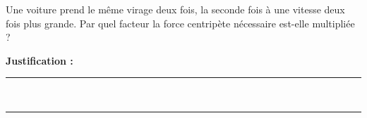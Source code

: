 Une voiture prend le même virage deux fois, la seconde fois à une vitesse deux fois plus grande. Par quel facteur la force centripète nécessaire est-elle multipliée ?

\choices

\noindent\textbf{Justification :} \hrulefill \\[2.5ex]
\rule{\linewidth}{0.4pt} \\[2.5ex]
\rule{\linewidth}{0.4pt}
\vfill
